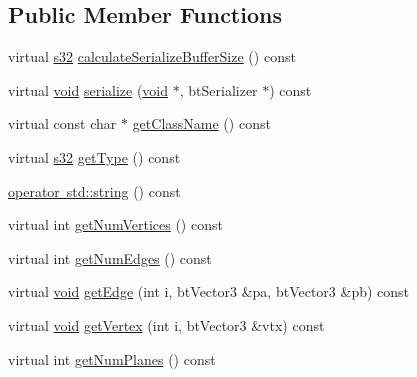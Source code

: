 \subsection*{Public Member Functions}
\begin{DoxyCompactItemize}
\item 
virtual \mbox{\hyperlink{_util_8h_aa62c75d314a0d1f37f79c4b73b2292e2}{s32}} \mbox{\hyperlink{classnjli_1_1_physics_shape_multi_sphere_a0a9f8e9382af4fb1115abf8bcb035931}{calculate\+Serialize\+Buffer\+Size}} () const
\item 
virtual \mbox{\hyperlink{_thread_8h_af1e856da2e658414cb2456cb6f7ebc66}{void}} \mbox{\hyperlink{classnjli_1_1_physics_shape_multi_sphere_a11acca92dfad6bbfc36017267362f128}{serialize}} (\mbox{\hyperlink{_thread_8h_af1e856da2e658414cb2456cb6f7ebc66}{void}} $\ast$, bt\+Serializer $\ast$) const
\item 
virtual const char $\ast$ \mbox{\hyperlink{classnjli_1_1_physics_shape_multi_sphere_a9a1d33140c781451ceccc749e0233033}{get\+Class\+Name}} () const
\item 
virtual \mbox{\hyperlink{_util_8h_aa62c75d314a0d1f37f79c4b73b2292e2}{s32}} \mbox{\hyperlink{classnjli_1_1_physics_shape_multi_sphere_abfd5533159ecea36c3f9147b49dfe7c2}{get\+Type}} () const
\item 
\mbox{\hyperlink{classnjli_1_1_physics_shape_multi_sphere_a34d365099e710fa7dfb1bf010674eb2c}{operator std\+::string}} () const
\item 
virtual int \mbox{\hyperlink{classnjli_1_1_physics_shape_multi_sphere_a8ffb7cb487afc5582cb4c1ae4997a065}{get\+Num\+Vertices}} () const
\item 
virtual int \mbox{\hyperlink{classnjli_1_1_physics_shape_multi_sphere_a24afd8e689b4111391f8079376edfbc6}{get\+Num\+Edges}} () const
\item 
virtual \mbox{\hyperlink{_thread_8h_af1e856da2e658414cb2456cb6f7ebc66}{void}} \mbox{\hyperlink{classnjli_1_1_physics_shape_multi_sphere_a4bf4fdd81dfddc61b0c40adf04bdddde}{get\+Edge}} (int i, bt\+Vector3 \&pa, bt\+Vector3 \&pb) const
\item 
virtual \mbox{\hyperlink{_thread_8h_af1e856da2e658414cb2456cb6f7ebc66}{void}} \mbox{\hyperlink{classnjli_1_1_physics_shape_multi_sphere_a467600545bb56fe471cb930f5a7b8aad}{get\+Vertex}} (int i, bt\+Vector3 \&vtx) const
\item 
virtual int \mbox{\hyperlink{classnjli_1_1_physics_shape_multi_sphere_ac89627a1d9681838e4539f30bd06ea82}{get\+Num\+Planes}} () const
\item 

\end{DoxyCompactItemize}
